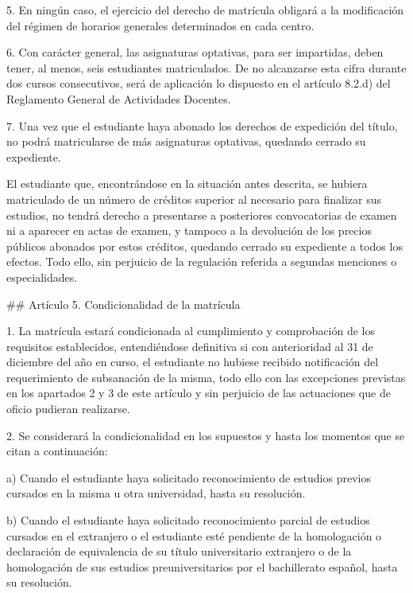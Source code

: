 \documentclass{article}
\begin{document}
\begin{itemize}
\begin{itemize}
\begin{scriptsize}
                  5. En ningún caso, el ejercicio del derecho de matrícula obligará a la modificación del régimen de horarios generales determinados en cada centro.

                  6. Con carácter general, las asignaturas optativas, para ser impartidas, deben tener, al menos, seis estudiantes matriculados. De no alcanzarse esta cifra durante dos cursos consecutivos, será de aplicación lo dispuesto en el artículo 8.2.d) del Reglamento General de Actividades Docentes.

                  7. Una vez que el estudiante haya abonado los derechos de expedición del título, no podrá matricularse de más asignaturas optativas, quedando cerrado su expediente.

                  El estudiante que, encontrándose en la situación antes descrita, se hubiera matriculado de un número de créditos superior al necesario para finalizar sus estudios, no tendrá derecho a presentarse a posteriores convocatorias de examen ni a aparecer en actas de examen, y tampoco a la devolución de los precios públicos abonados por estos créditos, quedando cerrado su expediente a todos los efectos. Todo ello, sin perjuicio de la regulación referida a segundas menciones o especialidades.

                  \#\# Artículo 5. Condicionalidad de la matrícula

                  1. La matrícula estará condicionada al cumplimiento y comprobación de los requisitos establecidos, entendiéndose definitiva si con anterioridad al 31 de diciembre del año en curso, el estudiante no hubiese recibido notificación del requerimiento de subsanación de la misma, todo ello con las excepciones previstas en los apartados 2 y 3 de este artículo y sin perjuicio de las actuaciones que de oficio pudieran realizarse.

                  2. Se considerará la condicionalidad en los supuestos y hasta los momentos que se citan a continuación:

                  a) Cuando el estudiante haya solicitado reconocimiento de estudios previos cursados en la misma u otra universidad, hasta su resolución.

                  b) Cuando el estudiante haya solicitado reconocimiento parcial de estudios cursados en el extranjero o el estudiante esté pendiente de la homologación o declaración de equivalencia de su título universitario extranjero o de la homologación de sus estudios preuniversitarios por el bachillerato español, hasta su resolución.


\end{scriptsize}
\end{itemize}
\end{itemize}
\end{document}
